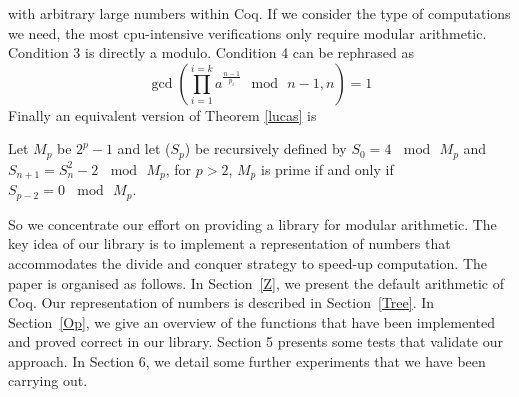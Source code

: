 with arbitrary large numbers within {\sc Coq}. If we consider the type of computations
we need, the most cpu-intensive verifications only require modular arithmetic.  
Condition 3 is directly a modulo. Condition 4 can be rephrased as
$$
\gcd(\prod_{i=1}^{i=k}a^{\frac{n-1}{p_i}} \mod\, n -1,n) = 1
$$
Finally an equivalent version of Theorem \ref{lucas} is
\begin{theorem}
Let $M_p$ be $2^p-1$ and let  ($S_p$) be recursively defined by $S_0= 4\, \mod\, M_p$ and $S_{n+1} = S_n^2 - 2\, \mod\, M_p$,
for $p > 2$, $M_p$ is prime if and only if $S_{p-2} = 0\, \mod\, M_p $.
\end{theorem}
 So we concentrate our effort on providing a library for modular arithmetic. The key idea of our
 library is to implement a representation of numbers that accommodates the divide and
 conquer strategy to speed-up computation. The paper is organised as follows. 
 In Section~\ref{Z}, we present the default arithmetic of {\sc Coq}.
 Our representation of numbers is described in Section~\ref{Tree}. In Section~\ref{Op}, we 
 give an overview of the functions that have been implemented and proved
 correct in our library. Section 5 presents some tests that validate our approach.
 In Section 6, we detail some further experiments that we have been carrying out.